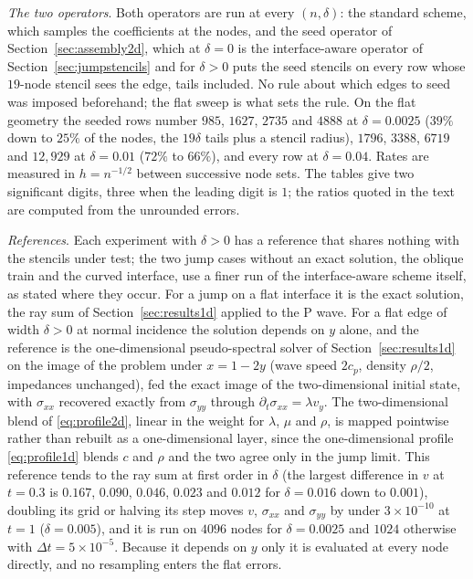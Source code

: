 \documentclass[11pt]{amsart}
\theoremstyle{definition}
\theoremstyle{remark}
\newcommand{\para}[1]{\par\smallskip\noindent\textit{#1}.\enspace}
\begin{document}
\para{The two operators}
Both operators are run at every $(n, \delta)$: the standard scheme, which
samples the coefficients at the nodes, and the seed operator of
Section~\ref{sec:assembly2d}, which at $\delta = 0$ is the interface-aware
operator of Section~\ref{sec:jumpstencils} and for $\delta > 0$ puts the
seed stencils on every row whose $19$-node stencil sees the edge, tails
included. No rule about which edges to seed was imposed beforehand; the
flat sweep is what sets the rule. On the flat geometry the seeded rows
number $985$, $1627$, $2735$ and $4888$ at $\delta = 0.0025$ ($39\%$ down
to $25\%$ of the nodes, the $19\delta$ tails plus a stencil radius),
$1796$, $3388$, $6719$ and $12{,}929$ at $\delta = 0.01$ ($72\%$ to
$66\%$), and every row at $\delta = 0.04$. Rates are measured in
$h = n^{-1/2}$ between successive node sets. The tables give two
significant digits, three when the leading digit is $1$; the ratios
quoted in the text are computed from the unrounded errors.

\para{References}
Each experiment with $\delta > 0$ has a reference that shares nothing
with the stencils under test; the two jump cases without an exact
solution, the oblique train and the curved interface, use a finer run of
the interface-aware scheme itself, as stated where they occur. For a jump on a flat interface it is the exact solution, the
ray sum of Section~\ref{sec:results1d} applied to the P wave. For a flat
edge of width $\delta > 0$ at normal incidence the solution depends on
$y$ alone, and the reference is the one-dimensional pseudo-spectral
solver of Section~\ref{sec:results1d} on the image of the problem under
$x = 1 - 2y$ (wave speed $2 c_p$, density $\rho / 2$, impedances
unchanged), fed the exact image of the two-dimensional initial state,
with $\sigma_{xx}$ recovered exactly from $\sigma_{yy}$ through
$\partial_t \sigma_{xx} = \lambda v_y$. The two-dimensional blend of
\eqref{eq:profile2d}, linear in the weight for $\lambda$, $\mu$ and
$\rho$, is mapped pointwise rather than rebuilt as a one-dimensional
layer, since the one-dimensional profile \eqref{eq:profile1d} blends $c$
and $\rho$ and the two agree only in the jump limit. This reference tends
to the ray sum at first order in $\delta$ (the largest difference in $v$
at $t = 0.3$ is $0.167$, $0.090$, $0.046$, $0.023$ and $0.012$ for
$\delta = 0.016$ down to $0.001$), doubling its grid or halving its step
moves $v$, $\sigma_{xx}$ and $\sigma_{yy}$ by under $3 \times 10^{-10}$ at
$t = 1$ ($\delta = 0.005$), and it is run on $4096$ nodes for $\delta = 0.0025$ and $1024$
otherwise with $\Delta t = 5 \times 10^{-5}$. Because it depends on $y$
only it is evaluated at every node directly, and no resampling enters
the flat errors.
\end{document}
